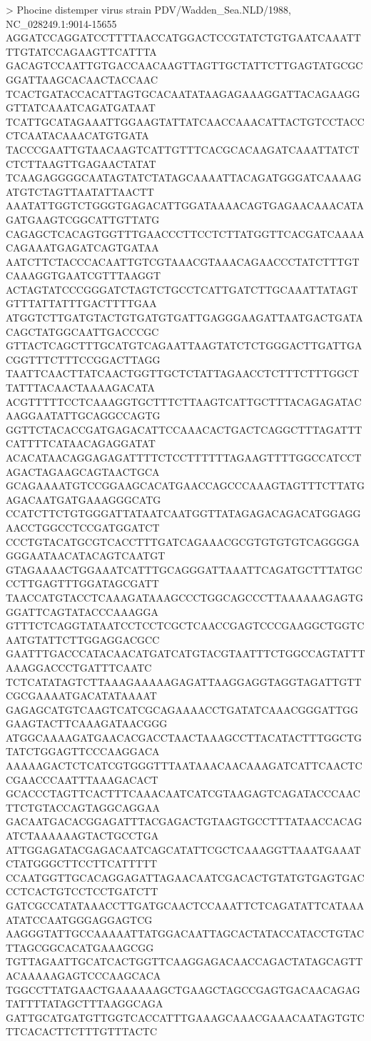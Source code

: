 > Phocine distemper virus strain PDV/Wadden_Sea.NLD/1988, NC_028249.1:9014-15655
AGGATCCAGGATCCTTTTAACCATGGACTCCGTATCTGTGAATCAAATTTTGTATCCAGAAGTTCATTTA
GACAGTCCAATTGTGACCAACAAGTTAGTTGCTATTCTTGAGTATGCGCGGATTAAGCACAACTACCAAC
TCACTGATACCACATTAGTGCACAATATAAGAGAAAGGATTACAGAAGGGTTATCAAATCAGATGATAAT
TCATTGCATAGAAATTGGAAGTATTATCAACCAAACATTACTGTCCTACCCTCAATACAAACATGTGATA
TACCCGAATTGTAACAAGTCATTGTTTCACGCACAAGATCAAATTATCTCTCTTAAGTTGAGAACTATAT
TCAAGAGGGGCAATAGTATCTATAGCAAAATTACAGATGGGATCAAAAGATGTCTAGTTAATATTAACTT
AAATATTGGTCTGGGTGAGACATTGGATAAAACAGTGAGAACAAACATAGATGAAGTCGGCATTGTTATG
CAGAGCTCACAGTGGTTTGAACCCTTCCTCTTATGGTTCACGATCAAAACAGAAATGAGATCAGTGATAA
AATCTTCTACCCACAATTGTCGTAAACGTAAACAGAACCCTATCTTTGTCAAAGGTGAATCGTTTAAGGT
ACTAGTATCCCGGGATCTAGTCTGCCTCATTGATCTTGCAAATTATAGTGTTTATTATTTGACTTTTGAA
ATGGTCTTGATGTACTGTGATGTGATTGAGGGAAGATTAATGACTGATACAGCTATGGCAATTGACCCGC
GTTACTCAGCTTTGCATGTCAGAATTAAGTATCTCTGGGACTTGATTGACGGTTTCTTTCCGGACTTAGG
TAATTCAACTTATCAACTGGTTGCTCTATTAGAACCTCTTTCTTTGGCTTATTTACAACTAAAAGACATA
ACGTTTTTCCTCAAAGGTGCTTTCTTAAGTCATTGCTTTACAGAGATACAAGGAATATTGCAGGCCAGTG
GGTTCTACACCGATGAGACATTCCAAACACTGACTCAGGCTTTAGATTTCATTTTCATAACAGAGGATAT
ACACATAACAGGAGAGATTTTCTCCTTTTTTAGAAGTTTTGGCCATCCTAGACTAGAAGCAGTAACTGCA
GCAGAAAATGTCCGGAAGCACATGAACCAGCCCAAAGTAGTTTCTTATGAGACAATGATGAAAGGGCATG
CCATCTTCTGTGGGATTATAATCAATGGTTATAGAGACAGACATGGAGGAACCTGGCCTCCGATGGATCT
CCCTGTACATGCGTCACCTTTGATCAGAAACGCGTGTGTGTCAGGGGAGGGAATAACATACAGTCAATGT
GTAGAAAACTGGAAATCATTTGCAGGGATTAAATTCAGATGCTTTATGCCCTTGAGTTTGGATAGCGATT
TAACCATGTACCTCAAAGATAAAGCCCTGGCAGCCCTTAAAAAAGAGTGGGATTCAGTATACCCAAAGGA
GTTTCTCAGGTATAATCCTCCTCGCTCAACCGAGTCCCGAAGGCTGGTCAATGTATTCTTGGAGGACGCC
GAATTTGACCCATACAACATGATCATGTACGTAATTTCTGGCCAGTATTTAAAGGACCCTGATTTCAATC
TCTCATATAGTCTTAAAGAAAAAGAGATTAAGGAGGTAGGTAGATTGTTCGCGAAAATGACATATAAAAT
GAGAGCATGTCAAGTCATCGCAGAAAACCTGATATCAAACGGGATTGGGAAGTACTTCAAAGATAACGGG
ATGGCAAAAGATGAACACGACCTAACTAAAGCCTTACATACTTTGGCTGTATCTGGAGTTCCCAAGGACA
AAAAAGACTCTCATCGTGGGTTTAATAAACAACAAAGATCATTCAACTCCGAACCCAATTTAAAGACACT
GCACCCTAGTTCACTTTCAAACAATCATCGTAAGAGTCAGATACCCAACTTCTGTACCAGTAGGCAGGAA
GACAATGACACGGAGATTTACGAGACTGTAAGTGCCTTTATAACCACAGATCTAAAAAAGTACTGCCTGA
ATTGGAGATACGAGACAATCAGCATATTCGCTCAAAGGTTAAATGAAATCTATGGGCTTCCTTCATTTTT
CCAATGGTTGCACAGGAGATTAGAACAATCGACACTGTATGTGAGTGACCCTCACTGTCCTCCTGATCTT
GATCGCCATATAAACCTTGATGCAACTCCAAATTCTCAGATATTCATAAAATATCCAATGGGAGGAGTCG
AAGGGTATTGCCAAAAATTATGGACAATTAGCACTATACCATACCTGTACTTAGCGGCACATGAAAGCGG
TGTTAGAATTGCATCACTGGTTCAAGGAGACAACCAGACTATAGCAGTTACAAAAAGAGTCCCAAGCACA
TGGCCTTATGAACTGAAAAAAGCTGAAGCTAGCCGAGTGACAACAGAGTATTTTATAGCTTTAAGGCAGA
GATTGCATGATGTTGGTCACCATTTGAAAGCAAACGAAACAATAGTGTCTTCACACTTCTTTGTTTACTC
